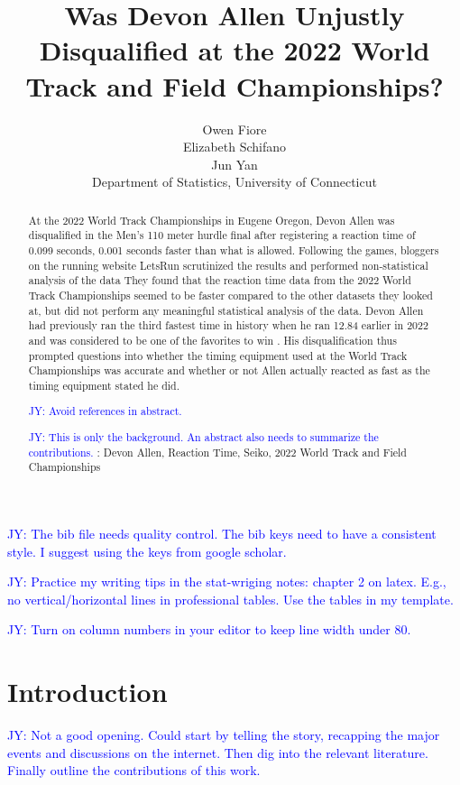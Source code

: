 \documentclass[12pt, letterpaper, titlepage]{article}
\title{Was Devon Allen Unjustly Disqualified at the 2022 World Track and Field Championships?}
\author{Owen Fiore\\
  Elizabeth Schifano\\
  Jun Yan\\[1ex]
  Department of Statistics, University of Connecticut\\
}
\date{}
\newcommand{\jy}[1]{\textcolor{blue}{JY: #1}}
\begin{document}
\maketitle


\begin{abstract}
  At the 2022 World Track Championships in Eugene Oregon, Devon Allen was disqualified in the
  Men's 110 meter hurdle final after registering a reaction time of 0.099 seconds, 0.001 
  seconds faster than what is allowed.  Following the games, bloggers on the running website 
  LetsRun scrutinized the results and performed non-statistical analysis of the data \citep{Johnson}
  They found that the reaction time data from the 2022 World Track Championships seemed to be faster 
  compared to the other datasets they looked at, but did not perform any meaningful statistical 
  analysis of the data.  Devon Allen had previously ran the third fastest time in history when 
  he ran 12.84 earlier in 2022 and was considered to be one of the favorites to win \citep{Preview}.  His 
  disqualification thus prompted questions into whether the timing equipment used at the World
  Track Championships was accurate and whether or not Allen actually reacted as fast as the 
  timing equipment stated he did.

  \jy{Avoid references in abstract.}
  
  \jy{This is only the background. An abstract also needs to summarize the contributions.}
\noindent{}:
Devon Allen, Reaction Time, Seiko, 2022 World Track and Field Championships 

\end{abstract}

\doublespace

\jy{The bib file needs quality control. The bib keys need to have a consistent
  style. I suggest using the keys from google scholar.}

\jy{Practice my writing tips in the stat-wriging notes: chapter 2 on
  latex. E.g., no vertical/horizontal lines in professional tables. Use the
  tables in my template.}

\jy{Turn on column numbers in your editor to keep line width under 80.}

\section{Introduction}
\label{sec:intro}


\jy{Not a good opening. Could start by telling the story, recapping the major
  events and discussions on the internet. Then dig into the relevant
  literature. Finally outline the contributions of this work.
}
\end{document}
